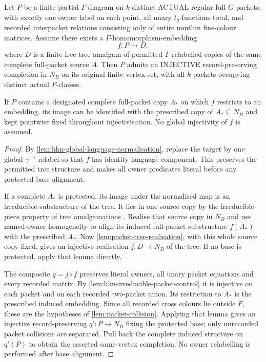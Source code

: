 \begin{lemma}
\label{lem:hkn-local-tree-packet-injectivisation}
Let \(P\) be a finite partial
\(\Gamma\)-diagram on \(k\) distinct
ACTUAL regular full \(G\)-packets,
with exactly one owner label on
each point, all unary
\(t_g\)-functions total, and
recorded interpacket relations
consisting only of entire
nonthin fine-colour matrices.
Assume there exists a
\(\Gamma\)-homomorphism-embedding
\[
        f:P\longrightarrow D,
\]
where \(D\) is a finite free
tree amalgam of permitted
\(\Gamma\)-relabelled copies of
the same complete full-packet
source \(A\). Then \(P\)
admits an INJECTIVE
record-preserving completion
in \(N_B\) on its original
finite vertex set, with
all \(k\) packets occupying
distinct actual \(F\)-classes.

If \(P\) contains a designated
complete full-packet copy
\(A_\ast\) on which \(f\)
restricts to an embedding,
its image can be identified
with the prescribed copy
of \(A_\ast\subseteq N_B\)
and kept pointwise fixed
throughout injectivisation.
No global injectivity of
\(f\) is assumed.
\end{lemma}
\begin{proof}
By \cref{lem:hkn-global-language-normalisation}, replace the target
by one global $\gamma^{-1}$-relabel so that $f$ has identity language
component. This preserves the permitted tree structure and makes all
owner predicates literal before any protected-base alignment.

If a complete $A_\ast$ is protected, its image under the normalised
map is an irreducible substructure of the tree. It lies in one
source copy by the irreducible-piece property of tree amalgamations
\cite[Observation~9.3]{HKN}. Realise that source copy in $N_B$ and
use named-owner homogeneity to align its induced full-packet
substructure $f(A_\ast)$ with the prescribed $A_\ast$. Now
\cref{lem:packet-tree-realisation}, with this whole source copy
fixed, gives an injective realisation $j:D\to N_B$ of the tree.
If no base is protected, apply that lemma directly.

The composite $q=j\circ f$ preserves literal owners, all unary
packet equations and every recorded matrix. By
\cref{lem:hkn-irreducible-packet-control} it is injective on each
packet and on each recorded two-packet union. Its restriction to
$A_\ast$ is the prescribed induced embedding. Since all recorded
cross colours lie outside $F$, these are the hypotheses of
\cref{lem:packet-collision}. Applying that lemma gives an injective
record-preserving $q':P\to N_B$ fixing the protected base; only
unrecorded packet collisions are separated. Pull back the complete
induced structure on $q'(P)$ to obtain the asserted same-vertex
completion. No owner relabelling is performed after base alignment.
\end{proof}

